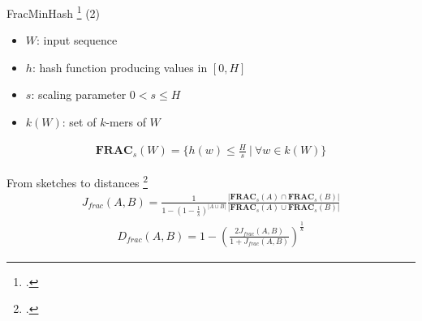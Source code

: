 \documentclass[aspectratio=169]{beamer}
\begin{document}
\begin{frame}{FracMinHash \footcite{irberLightweightCompositionalAnalysis2022} (2)}
    \begin{itemize}
        \item $W$: input sequence
        \item $h$: hash function producing values in $[0, H]$
        \item $s$: scaling parameter $0 < s \leq H$
        \item $k(W)$: set of $k$-mers of $W$
    \end{itemize}
    \begin{align}
        \mathbf{FRAC}_s(W) = \{h(w) \leq \frac{H}{s} ~|~ \forall w \in k(W)\}
    \end{align}
\end{frame}

\begin{frame}{From sketches to distances \footcite{heraDerivingConfidenceIntervals2023}}
    \begin{align}
        J_{frac}(A, B) = \frac{1}{1 - (1 - \frac{1}{s})^{|A \cup B|}} \frac{|\mathbf{FRAC}_s(A) \cap \mathbf{FRAC}_s(B)|}{|\mathbf{FRAC}_s(A) \cup \mathbf{FRAC}_s(B)|}
    \end{align}
    \begin{align}
        D_{frac}(A, B) = 1 - (\frac{2 J_{frac}(A, B)}{1+J_{frac}(A, B)})^{\frac{1}{k}}
    \end{align}
\end{frame}
\end{document}
